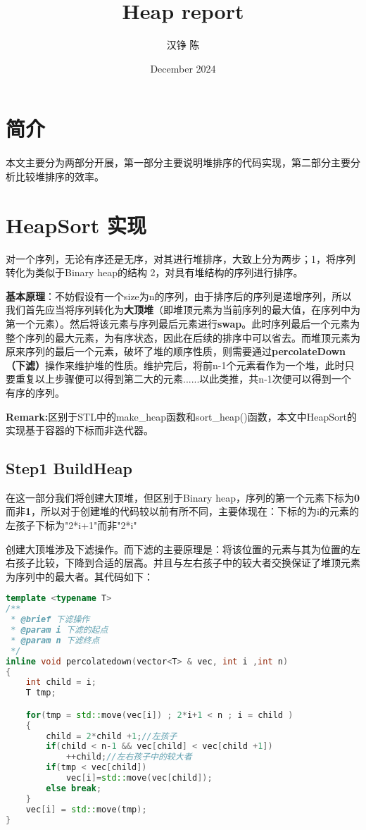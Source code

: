 \documentclass[fontset=fandol]{ctexart}
\title{Heap report}
\author{汉铮 陈}
\date{ December 2024}
\begin{document}
\maketitle
\section{简介}
本文主要分为两部分开展，第一部分主要说明堆排序的代码实现，第二部分主要分析比较堆排序的效率。
\section{HeapSort 实现}
对一个序列，无论有序还是无序，对其进行堆排序，大致上分为两步；1，将序列转化为类似于Binary heap的结构 2，对具有堆结构的序列进行排序。

\textbf{基本原理}：不妨假设有一个size为n的序列，由于排序后的序列是递增序列，所以我们首先应当将序列转化为\textbf{大顶堆}（即堆顶元素为当前序列的最大值，在序列中为第一个元素）。然后将该元素与序列最后元素进行\textbf{swap}。此时序列最后一个元素为整个序列的最大元素，为有序状态，因此在后续的排序中可以省去。而堆顶元素为原来序列的最后一个元素，破坏了堆的顺序性质，则需要通过\textbf{percolateDown（下滤）}操作来维护堆的性质。维护完后，将前n-1个元素看作为一个堆，此时只要重复以上步骤便可以得到第二大的元素......以此类推，共n-1次便可以得到一个有序的序列。

\textbf{Remark:}区别于STL中的make\_heap函数和sort\_heap()函数，本文中HeapSort的实现基于容器的下标而非迭代器。
\subsection{Step1 BuildHeap}
在这一部分我们将创建大顶堆，但区别于Binary heap，序列的第一个元素下标为\textbf{0}而非\textbf{1}，所以对于创建堆的代码较以前有所不同，主要体现在：下标的为i的元素的左孩子下标为"2*i+1"而非"2*i"

创建大顶堆涉及下滤操作。而下滤的主要原理是：将该位置的元素与其为位置的左右孩子比较，下降到合适的层高。并且与左右孩子中的较大者交换保证了堆顶元素为序列中的最大者。其代码如下：
\begin{lstlisting}[language=C++, caption={percolatdown()函数}]  
template <typename T>
/**
 * @brief 下滤操作
 * @param i 下滤的起点
 * @param n 下滤终点
 */
inline void percolatedown(vector<T> & vec, int i ,int n)
{
    int child = i;
    T tmp;

    for(tmp = std::move(vec[i]) ; 2*i+1 < n ; i = child ) 
    {
        child = 2*child +1;//左孩子
        if(child < n-1 && vec[child] < vec[child +1])
            ++child;//左右孩子中的较大者
        if(tmp < vec[child])
            vec[i]=std::move(vec[child]);
        else break;
    }
    vec[i] = std::move(tmp);
}

\end{lstlisting}
\end{document}
